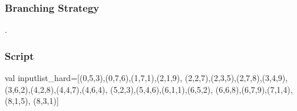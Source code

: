 \documentclass[a4paper,halfparskip]{scrartcl}
\begin{document}
\subsubsection{Branching Strategy}
.


\subsubsection{Script}
\begin{myverbatim}
val inputlist_hard=[(0,5,3),(0,7,6),(1,7,1),(2,1,9),
                    (2,2,7),(2,3,5),(2,7,8),(3,4,9),
                    (3,6,2),(4,2,8),(4,4,7),(4,6,4),
                    (5,2,3),(5,4,6),(6,1,1),(6,5,2),
                    (6,6,8),(6,7,9),(7,1,4),(8,1,5),
                    (8,3,1)]                 


\end{myverbatim}
\end{document}
